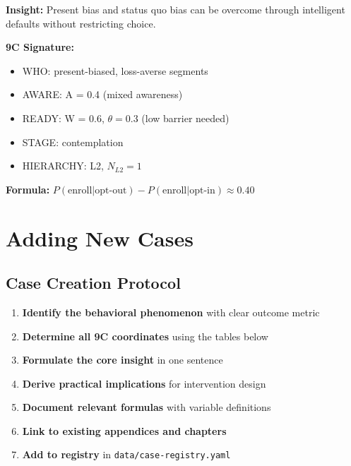\begin{tcolorbox}[colback=green!5, colframe=green!50, title=Default Nudge]
\textbf{Insight:} Present bias and status quo bias can be overcome through intelligent defaults without restricting choice.

\textbf{9C Signature:}
\begin{itemize}
    \item WHO: present-biased, loss-averse segments
    \item AWARE: A = 0.4 (mixed awareness)
    \item READY: W = 0.6, $\theta = 0.3$ (low barrier needed)
    \item STAGE: contemplation
    \item HIERARCHY: L2, $N_{L2} = 1$
\end{itemize}

\textbf{Formula:} $P(\text{enroll}|\text{opt-out}) - P(\text{enroll}|\text{opt-in}) \approx 0.40$
\end{tcolorbox}

\section{Adding New Cases}

\subsection{Case Creation Protocol}

\begin{enumerate}
    \item \textbf{Identify the behavioral phenomenon} with clear outcome metric
    \item \textbf{Determine all 9C coordinates} using the tables below
    \item \textbf{Formulate the core insight} in one sentence
    \item \textbf{Derive practical implications} for intervention design
    \item \textbf{Document relevant formulas} with variable definitions
    \item \textbf{Link to existing appendices and chapters}
    \item \textbf{Add to registry} in \texttt{data/case-registry.yaml}
\end{enumerate}

